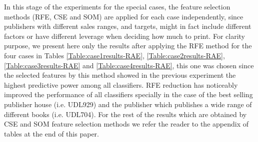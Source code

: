\documentclass[a4paper,10pt,twocolumn,preprint,3p]{elsarticle}
\begin{document}
In this stage of the experiments for the special cases, the
feature selection methods (RFE, CSE and SOM) are applied for each case
independently, since publishers with different sales ranges, and
targets, might in fact include different factors or have different
leverage when deciding how much to print. For clarity purpose, we present 
here only the results after applying the RFE method for the four cases in Tables
\ref{Table:case1results-RAE}, \ref{Table:case2results-RAE},
\ref{Table:case3results-RAE} and \ref{Table:case4results-RAE}, this
one was chosen since the selected features by this
method showed in the previous experiment the highest predictive power among 
all classifiers. 
RFE reduction has noticeably improved the performance of all classifiers 
specially in the case of the best selling publisher house (i.e. UDL929) and the
publisher which publishes a wide range of different books (i.e. UDL704). 
For the rest of the results which are obtained by CSE and SOM feature selection 
methods we refer the reader to the appendix of tables at the end of this paper.  


\begin{table*}[!ht]
\caption{Predicting Total sales for PublishingCo-UDL929 (ReliefFAttributeEval-FS). Best values in bold.}
\centering{}%
\label{Table:case1results-RAE}
\end{table*}
\end{document}
